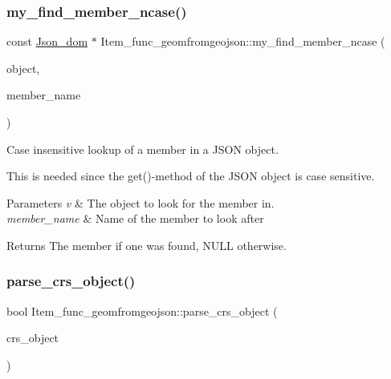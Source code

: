 \subsubsection{\texorpdfstring{my\+\_\+find\+\_\+member\+\_\+ncase()}{my\_find\_member\_ncase()}}
{\footnotesize\ttfamily const \mbox{\hyperlink{classJson__dom}{Json\+\_\+dom}} $\ast$ Item\+\_\+func\+\_\+geomfromgeojson\+::my\+\_\+find\+\_\+member\+\_\+ncase (\begin{DoxyParamCaption}\item[{const \mbox{\hyperlink{classJson__object}{Json\+\_\+object}} $\ast$}]{object,  }\item[{const char $\ast$}]{member\+\_\+name }\end{DoxyParamCaption})}

Case insensitive lookup of a member in a J\+S\+ON object.

This is needed since the get()-\/method of the J\+S\+ON object is case sensitive.


\begin{DoxyParams}{Parameters}
{\em v} & The object to look for the member in. \\
\hline
{\em member\+\_\+name} & Name of the member to look after\\
\hline
\end{DoxyParams}
\begin{DoxyReturn}{Returns}
The member if one was found, N\+U\+LL otherwise. 
\end{DoxyReturn}
\mbox{\label{classItem__func__geomfromgeojson_a4a47473edbbccf84893ce91893c53f5a}} 
\subsubsection{\texorpdfstring{parse\+\_\+crs\+\_\+object()}{parse\_crs\_object()}}
{\footnotesize\ttfamily bool Item\+\_\+func\+\_\+geomfromgeojson\+::parse\+\_\+crs\+\_\+object (\begin{DoxyParamCaption}\item[{const \mbox{\hyperlink{classJson__object}{Json\+\_\+object}} $\ast$}]{crs\+\_\+object }\end{DoxyParamCaption})}

